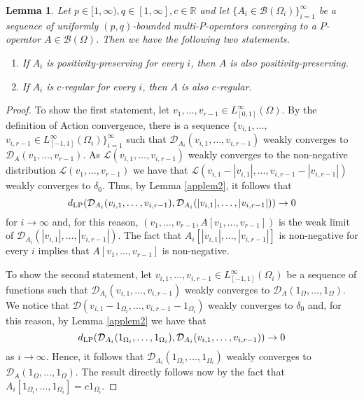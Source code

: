 \documentclass[11pt]{article}
\newtheorem{lemma}[theorem]{Lemma}
\begin{document}
\begin{lemma}\label{LemmaClosedPosPres} Let $p\in [1,\infty),q\in [1,\infty],c\in\mathbb{R}$ and let $\{A_i\in\mathcal{B}(\Omega_i)\}_{i=1}^\infty$ be a sequence of uniformly $(p,q)$-bounded  multi-$P$-operators converging to a $P$-operator $A\in\mathcal{B}(\Omega)$. Then we have the following two statements.
\begin{enumerate}
\item If $A_i$ is positivity-preserving for every $i$, then $A$ is also positivity-preserving.
\item If $A_i$ is $c$-regular for every $i$, then $A$ is also $c$-regular.
\end{enumerate}
\end{lemma}
\begin{proof}
To show the first statement, let $v_1,\ldots,v_{r-1}\in L^\infty_{[0,1]}(\Omega)$. By the definition of Action convergence, there is a sequence $\{v_{i,1},\ldots,$\ $ v_{i,r-1}\in L_{[-1,1]}^\infty(\Omega_i)\}_{i=1}^\infty$  such that $\mathcal{D}_{A_i}(v_{i,1},\ldots,v_{i,r-1})$ weakly converges to $\mathcal{D}_A(v_1,\ldots,v_{r-1})$. As $\mathcal{L}(v_{i,1},\ldots,v_{i,r-1})$ weakly converges to the non-negative distribution $\mathcal{L}(v_1,\ldots,v_{r-1})$ we have that $\mathcal{L}(v_{i,1}-|v_{i,{1}}|,\ldots,v_{i,r-1}-|v_{i,{r-1}}|)$ weakly converges to $\delta_0$. Thus, by Lemma \ref{applem2}, it follows that 
$$d_{\rm LP}(\mathcal{D}_{A_i}(v_{i,1},\ldots,v_{i,r-1}),\mathcal{D}_{A_i}(|v_{i,1}|,\ldots,|v_{i,r-1}|))\rightarrow 0$$
for $i\rightarrow \infty$ and, for  this reason, $(v_1,\ldots,v_{r-1},A[v_1,\ldots,v_{r-1}])$ is the weak limit of $\mathcal{D}_{A_i}(|v_{i,1}|,\ldots, |v_{i,r-1}|)$. The fact that $A_i[|v_{i,1}|,\ldots, |v_{i,r-1}|]$ is non-negative for every $i$  implies that $A[v_1,\ldots,v_{r-1}]$ is non-negative. 

To show the second statement, let $v_{i,1},\ldots, v_{i,r-1}\in L_{[-1,1]}^\infty(\Omega_i)$ be a sequence of functions such that $\mathcal{D}_{A_i}(v_{i,1},\ldots, v_{i,r-1})$ weakly converges to $\mathcal{D}_A(1_\Omega,\ldots, 1_\Omega)$. We notice that $\mathcal{D}(v_{i,1}-1_{\Omega_i},\ldots,v_{i,r-1}-1_{\Omega_i})$ weakly converges to $\delta_0$ and, for this reason, by Lemma \ref{applem2} we have that 
$$d_{\rm LP}(\mathcal{D}_{A_i}(1_{\Omega_i},\ldots,1_{\Omega_i}),\mathcal{D}_{A_i}(v_{i,1},\ldots,v_{i,r-1}))\rightarrow 0$$ as $i\rightarrow \infty$. Hence, it follows that $\mathcal{D}_{A_i}(1_{\Omega_i},\ldots,1_{\Omega_i})$ weakly converges to $\mathcal{D}_A(1_\Omega,\ldots,1_\Omega)$. The result directly follows now by the fact that $ A_i[1_{\Omega_i},\ldots,1_{\Omega_i}]=c1_{\Omega_i}$.
\end{proof}
\end{document}
